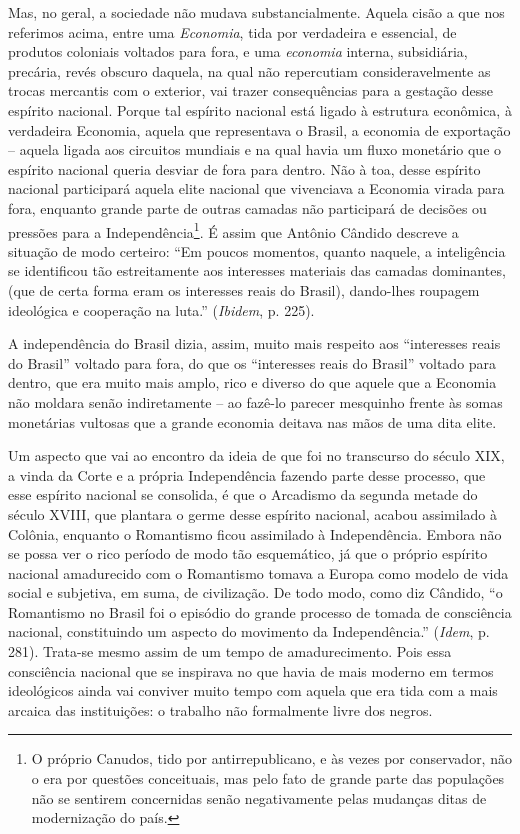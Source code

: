 Mas, no geral, a sociedade não mudava substancialmente. Aquela cisão a
que nos referimos acima, entre uma \emph{Economia}, tida por verdadeira
e essencial, de produtos coloniais voltados para fora, e uma
\emph{economia} interna, subsidiária, precária, revés obscuro daquela,
na qual não repercutiam consideravelmente as trocas mercantis com o
exterior, vai trazer consequências para a gestação desse espírito
nacional. Porque tal espírito nacional está ligado à estrutura
econômica, à verdadeira Economia, aquela que representava o Brasil, a
economia de exportação -- aquela ligada aos circuitos mundiais e na qual
havia um fluxo monetário que o espírito nacional queria desviar de fora
para dentro. Não à toa, desse espírito nacional participará aquela elite
nacional que vivenciava a Economia virada para fora, enquanto grande
parte de outras camadas não participará de decisões ou pressões para a
Independência\footnote{O próprio Canudos, tido por antirrepublicano, e
  às vezes por conservador, não o era por questões conceituais, mas pelo
  fato de grande parte das populações não se sentirem concernidas senão
  negativamente pelas mudanças ditas de modernização do país.}. É assim
que Antônio Cândido descreve a situação de modo certeiro: ``Em poucos
momentos, quanto naquele, a inteligência se identificou tão
estreitamente aos interesses materiais das camadas dominantes, (que de
certa forma eram os interesses reais do Brasil), dando-lhes roupagem
ideológica e cooperação na luta.'' (\emph{Ibidem}, p. 225).

A independência do Brasil dizia, assim, muito mais respeito aos
``interesses reais do Brasil'' voltado para fora, do que os ``interesses
reais do Brasil'' voltado para dentro, que era muito mais amplo, rico e
diverso do que aquele que a Economia não moldara senão indiretamente --
ao fazê-lo parecer mesquinho frente às somas monetárias vultosas que a
grande economia deitava nas mãos de uma dita elite.

Um aspecto que vai ao encontro da ideia de que foi no transcurso do
século XIX, a vinda da Corte e a própria Independência fazendo parte
desse processo, que esse espírito nacional se consolida, é que o
Arcadismo da segunda metade do século XVIII, que plantara o germe desse
espírito nacional, acabou assimilado à Colônia, enquanto o Romantismo
ficou assimilado à Independência. Embora não se possa ver o rico período
de modo tão esquemático, já que o próprio espírito nacional amadurecido
com o Romantismo tomava a Europa como modelo de vida social e subjetiva,
em suma, de civilização. De todo modo, como diz Cândido, ``o Romantismo
no Brasil foi o episódio do grande processo de tomada de consciência
nacional, constituindo um aspecto do movimento da Independência.''
(\emph{Idem}, p. 281). Trata-se mesmo assim de um tempo de
amadurecimento. Pois essa consciência nacional que se inspirava no que
havia de mais moderno em termos ideológicos ainda vai conviver muito
tempo com aquela que era tida com a mais arcaica das instituições: o
trabalho não formalmente livre dos negros.

